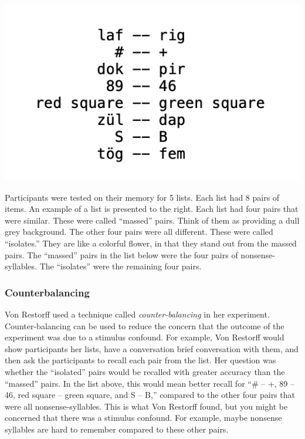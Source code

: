 \documentclass[
  oneside,
  12pt]{crumpbook}
\newenvironment{floatright50}{%
  \wrapfigure{R}{.5\textwidth}%
  }{%
  \endwrapfigure}
\begin{document}
\begin{floatright50}
\includegraphics[width=1\linewidth]{imgs/Von_restorff_Stimuli}

\end{floatright50}

Participants were tested on their memory for 5 lists. Each list had 8 pairs of items. An example of a list is presented to the right. Each list had four pairs that were similar. These were called ``massed'' pairs. Think of them as providing a dull grey background. The other four pairs were all different. These were called ``isolates.'' They are like a colorful flower, in that they stand out from the massed pairs. The ``massed'' pairs in the list below were the four pairs of nonsense-syllables. The ``isolates'' were the remaining four pairs.

\hypertarget{counterbalancing}{%
\subsubsection{Counterbalancing}\label{counterbalancing}}

Von Restorff used a technique called \emph{counter-balancing} in her experiment. Counter-balancing can be used to reduce the concern that the outcome of the experiment was due to a stimulus confound. For example, Von Restorff would show participants her lists, have a conversation brief conversation with them, and then ask the participants to recall each pair from the list. Her question was whether the ``isolated'' pairs would be recalled with greater accuracy than the ``massed'' pairs. In the list above, this would mean better recall for ``\# -- +, 89 -- 46, red square -- green square, and S -- B,'' compared to the other four pairs that were all nonsense-syllables. This is what Von Restorff found, but you might be concerned that there was a stimulus confound. For example, maybe nonsense syllables are hard to remember compared to these other pairs.
\end{document}
